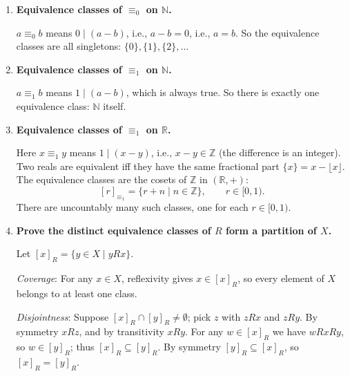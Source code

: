 \documentclass[11pt,openany]{book}
\def\NN{\mathbb{N}}
\def\RN{\mathbb{R}}
\def\ZN{\mathbb{Z}}
\begin{document}
\begin{enumerate}[{0.}1. ]
We must show reflexivity, symmetry, and transitivity.

\textit{Reflexivity}: $a - a = 0 = 0 \cdot n$, so $a \equiv_n a$.

\textit{Symmetry}: If $a \equiv_n b$, then $n \mid (a-b)$, so $a - b = kn$ for some $k \in \ZN$. Then $b - a = (-k)n$, so $n \mid (b-a)$, giving $b \equiv_n a$.

\textit{Transitivity}: If $a \equiv_n b$ and $b \equiv_n c$, then $a - b = kn$ and $b - c = mn$ for integers $k,m$. Then $a - c = (a-b)+(b-c) = (k+m)n$, so $a \equiv_n c$.

\item \textbf{Equivalence classes of $\equiv_0$ on $\NN$.}

$a \equiv_0 b$ means $0 \mid (a-b)$, i.e., $a - b = 0$, i.e., $a = b$. So the equivalence classes are all singletons: $\{0\}, \{1\}, \{2\}, \ldots$

\item \textbf{Equivalence classes of $\equiv_1$ on $\NN$.}

$a \equiv_1 b$ means $1 \mid (a - b)$, which is always true. So there is exactly one equivalence class: $\NN$ itself.

\item \textbf{Equivalence classes of $\equiv_1$ on $\RN$.}

Here $x \equiv_1 y$ means $1 \mid (x-y)$, i.e., $x - y \in \mathbb{Z}$ (the difference is an integer).
Two reals are equivalent iff they have the same fractional part $\{x\} = x - \lfloor x\rfloor$.
The equivalence classes are the cosets of $\mathbb{Z}$ in $(\mathbb{R},+)$:
\[
  [r]_{\equiv_1} = \{r + n \mid n \in \mathbb{Z}\}, \qquad r \in [0,1).
\]
There are uncountably many such classes, one for each $r \in [0,1)$.

\item \textbf{Prove the distinct equivalence classes of $R$ form a partition of $X$.}

Let $[x]_R = \{y \in X \mid y R x\}$.

\textit{Coverage}: For any $x \in X$, reflexivity gives $x \in [x]_R$, so every element of $X$ belongs to at least one class.

\textit{Disjointness}: Suppose $[x]_R \cap [y]_R \neq \emptyset$; pick $z$ with $z R x$ and $z R y$. By symmetry $x R z$, and by transitivity $x R y$. For any $w \in [x]_R$ we have $w R x R y$, so $w \in [y]_R$; thus $[x]_R \subseteq [y]_R$. By symmetry $[y]_R \subseteq [x]_R$, so $[x]_R = [y]_R$.


\end{enumerate}
\end{document}
